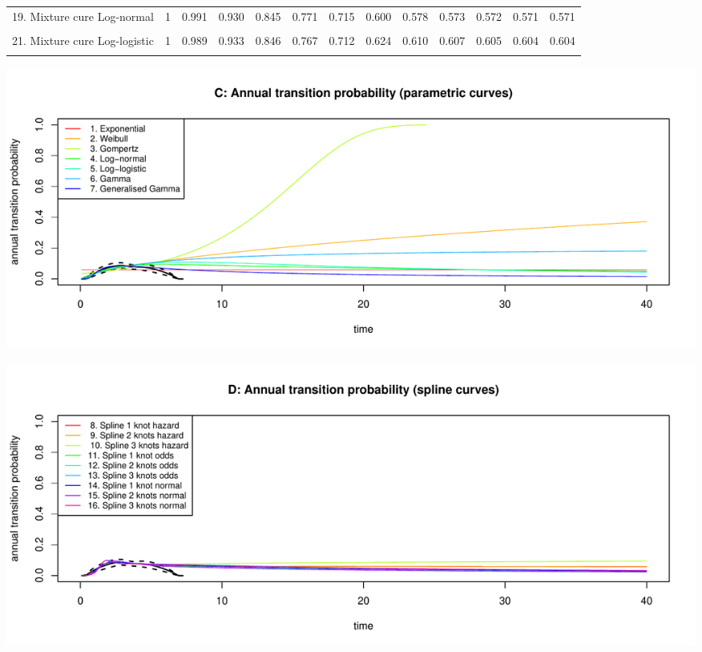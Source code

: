 \documentclass[]{article}
\begin{document}
\begin{table}
{\begin{tabular}[t]{lrrrrrrrrrrrr}
19. Mixture cure Log-normal & 1 & 0.991 & 0.930 & 0.845 & 0.771 & 0.715 & 0.600 & 0.578 & 0.573 & 0.572 & 0.571 & 0.571\\
\cellcolor{gray!6}{20. Non-mixture cure Log-normal} & \cellcolor{gray!6}{1} & \cellcolor{gray!6}{0.991} & \cellcolor{gray!6}{0.930} & \cellcolor{gray!6}{0.845} & \cellcolor{gray!6}{0.771} & \cellcolor{gray!6}{0.715} & \cellcolor{gray!6}{0.597} & \cellcolor{gray!6}{0.571} & \cellcolor{gray!6}{0.564} & \cellcolor{gray!6}{0.561} & \cellcolor{gray!6}{0.561} & \cellcolor{gray!6}{0.560}\\
21. Mixture cure Log-logistic & 1 & 0.989 & 0.933 & 0.846 & 0.767 & 0.712 & 0.624 & 0.610 & 0.607 & 0.605 & 0.604 & 0.604\\
\cellcolor{gray!6}{22. Non-mixture cure Log-logistic} & \cellcolor{gray!6}{1} & \cellcolor{gray!6}{0.989} & \cellcolor{gray!6}{0.933} & \cellcolor{gray!6}{0.846} & \cellcolor{gray!6}{0.767} & \cellcolor{gray!6}{0.712} & \cellcolor{gray!6}{0.624} & \cellcolor{gray!6}{0.611} & \cellcolor{gray!6}{0.607} & \cellcolor{gray!6}{0.606} & \cellcolor{gray!6}{0.605} & \cellcolor{gray!6}{0.605}\\
\bottomrule
\end{tabular}}
\end{table}

\begin{flushleft}\includegraphics[height=0.29\textheight]{Images/validate_extrapolation1-3} \end{flushleft}

\begin{flushleft}\includegraphics[height=0.29\textheight]{Images/validate_extrapolation1-4} \end{flushleft}
\end{document}

